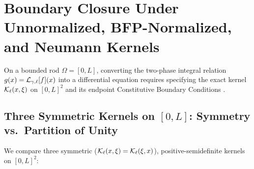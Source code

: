 \section{Boundary Closure Under Unnormalized, BFP-Normalized, and Neumann Kernels}\label{sec:boundary}

On a bounded rod $\Omega = [0,L]$, converting the two-phase integral relation $g(x) = \mathcal{L}_{\gamma,\ell}[f](x)$ into a differential equation requires specifying the exact kernel $\mathcal{K}_\ell(x,\xi)$ on $[0,L]^2$ and its endpoint Constitutive Boundary Conditions \cite{FernandezSaez2016,Romano2017,MikhasevNobili2020,NobiliPramanik2025b}.

\subsection{Three Symmetric Kernels on $[0,L]$: Symmetry vs.\ Partition of Unity}\label{subsec:three_kernels}

We compare three symmetric ($\mathcal{K}_\ell(x,\xi) = \mathcal{K}_\ell(\xi,x)$), positive-semidefinite kernels on $[0,L]^2$:

